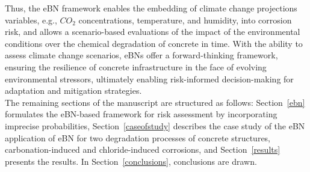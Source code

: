 Thus, the eBN framework enables the embedding of climate change projections variables, e.g., $CO_2$ concentrations, temperature, and humidity, into corrosion risk, and allows a scenario-based evaluations of the impact of the environmental conditions over the chemical degradation of concrete in time.
With the ability to assess climate change scenarios, eBNs offer a forward-thinking framework, ensuring the resilience of concrete infrastructure in the face of evolving environmental stressors, ultimately enabling risk-informed decision-making for adaptation and mitigation strategies.\\

The remaining sections of the manuscript are structured as follows: Section~\ref{ebn} formulates the eBN-based framework for risk assessment by incorporating imprecise probabilities, Section~\ref{caseofstudy} describes the case study of the eBN application of eBN for two degradation processes of concrete structures, carbonation-induced and chloride-induced corrosions, and Section~\ref{results} presents the results. In Section~\ref{conclusions}, conclusions are drawn.

